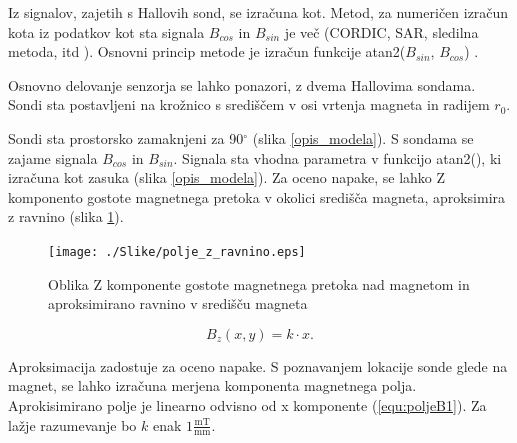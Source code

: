 Iz signalov, zajetih s Hallovih sond, se izračuna kot. Metod, za numeričen izračun kota iz podatkov kot sta signala $B_{cos}$ in $B_{sin}$ je več (CORDIC, SAR, sledilna metoda, itd \cite{ICHaus_interpolate}). Osnovni
princip metode je izračun funkcije atan2($B_{sin}$, $B_{cos}$) \cite{atan2Matlab}.

Osnovno delovanje senzorja se lahko ponazori, z dvema Hallovima sondama.  Sondi sta postavljeni na krožnico s središčem v osi vrtenja magneta in radijem $r_0$.

Sondi sta prostorsko zamaknjeni za 90$^\circ$ (slika \ref{opis_modela}).  S sondama se zajame signala $B_{cos}$ in $B_{sin}$. Signala sta vhodna parametra v funkcijo atan2(), ki izračuna kot zasuka (slika \ref{opis_modela}).
Za oceno napake, se lahko Z komponento gostote magnetnega pretoka v okolici središča magneta, aproksimira z ravnino (slika \ref{polje_z_ravnino}).
\begin{figure}[h]
	\centering
	\texttt{[image: ./Slike/polje\_z\_ravnino.eps]}
	\caption{Oblika Z komponente gostote magnetnega pretoka nad magnetom in aproksimirano ravnino v središču magneta}
	\label{polje_z_ravnino}
\end{figure}
\begin{equation}
\label{equ:poljeB1}
B_z(x,y)=k\cdot x.
\end{equation} 



Aproksimacija zadostuje za oceno napake. S poznavanjem lokacije sonde glede na magnet, se lahko izračuna merjena komponenta magnetnega polja. Aprokisimirano polje je linearno odvisno od x komponente (\ref{equ:poljeB1}).
Za lažje razumevanje bo $k$ enak $1\frac{\mathrm{mT}}{\mathrm{mm}}$.

